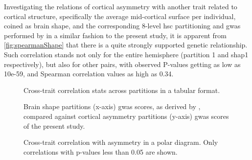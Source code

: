 Investigating the relations of cortical asymmetry with another trait related to cortical structure, specifically the average mid-cortical surface per individual, coined as brain shape, and the corresponding 8-level \ac{hsc} partitioning and \ac{gwas} performed by \citet{Naqvi2021} in a similar fashion to the present study, it is apparent from \autoref{fig:spearmanShape} that there is a quite strongly supported genetic relationship. Such correlation stands not only for the entire hemisphere (partition 1 and shap1 respectively), but also for other pairs, with observed P-values getting as low as 10e-59, and Spearman correlation values as high as 0.34.





\begin{figure}[H]

	\caption{Cross-trait correlation stats across partitions in a tabular format.}
	\label{fig:spearmanOtherTraits}
	
\end{figure}

\begin{figure}[H]
\begin{adjustwidth}{-3cm}{-3cm}
	\par\medskip
	\caption[Brain shape genetically related to cortical asymmetry]{Brain shape partitions (x-axis) \ac{gwas} scores, as derived by \citet{Naqvi2021}, compared against cortical asymmetry partitions (y-axis) \ac{gwas} scores of the present study.}
	\label{fig:spearmanShape}
\end{adjustwidth}
\end{figure}


\begin{figure}[H]
	\begin{adjustwidth}{-4cm}{-3cm}
		\centering
		\subfloat{
			
		}
		\subfloat{
			
		}
	\end{adjustwidth}	
	\caption[Cross-trait correlation with cortical asymmetry in a polar diagram]{Cross-trait correlation with asymmetry in a polar diagram. Only correlations with p-values less than 0.05 are shown.}
	\label{fig:cross_trait_polar}
\end{figure}


